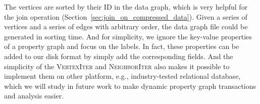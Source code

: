 The vertices are sorted by their ID in the data graph, which is very helpful for the join operation (Section~\ref{sec:join_on_compressed_data}).
Given a series of vertices and a series of edges with arbitrary order,
the data graph file could be generated in sorting time.
And for simplicity, we ignore the key-value properties of a property graph and focus on the labels.
In fact, these properties can be added to our disk format by simply add the corresponding fields.
And the simplicity of the \textsc{VertexIter} and \textsc{NeighborIter} also makes it possible to implement them on other platform, e.g., industry-tested relational database, which we will study in future work to make dynamic property graph transactions and analysis easier.
